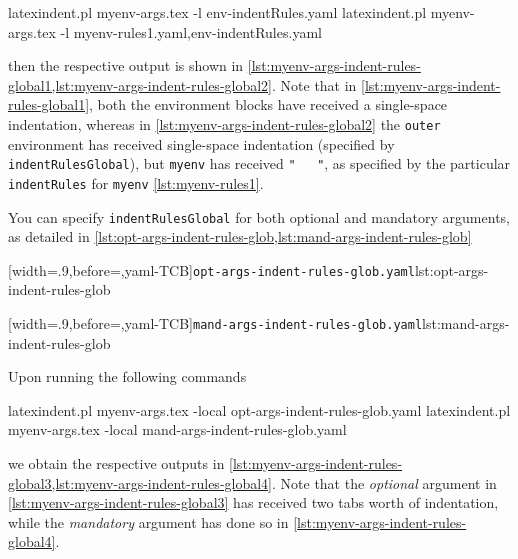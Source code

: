 	\begin{commandshell}
latexindent.pl  myenv-args.tex -l env-indentRules.yaml
latexindent.pl  myenv-args.tex -l myenv-rules1.yaml,env-indentRules.yaml
\end{commandshell}
	then the respective output is shown in \cref{lst:myenv-args-indent-rules-global1,lst:myenv-args-indent-rules-global2}. Note that
	in \cref{lst:myenv-args-indent-rules-global1}, both the environment blocks have received a single-space indentation, whereas in
	\cref{lst:myenv-args-indent-rules-global2} the \texttt{outer} environment has received single-space indentation (specified by \texttt{indentRulesGlobal}),
	but \texttt{myenv} has received \lstinline!"   "!, as specified by the particular \texttt{indentRules} for \texttt{myenv} \vref{lst:myenv-rules1}.

	\begin{minipage}{.45\textwidth}
	\end{minipage}
	\hfill
	\begin{minipage}{.45\textwidth}
	\end{minipage}

	You can specify \texttt{indentRulesGlobal} for both optional and mandatory arguments, as detailed in \cref{lst:opt-args-indent-rules-glob,lst:mand-args-indent-rules-glob}

	\begin{minipage}{.49\textwidth}
		[width=.9\linewidth,before=\centering,yaml-TCB]{\texttt{opt-args-indent-rules-glob.yaml}}{lst:opt-args-indent-rules-glob}
	\end{minipage}
	\hfill
	\begin{minipage}{.49\textwidth}
		[width=.9\linewidth,before=\centering,yaml-TCB]{\texttt{mand-args-indent-rules-glob.yaml}}{lst:mand-args-indent-rules-glob}
	\end{minipage}

	Upon running the following commands
	\begin{commandshell}
latexindent.pl  myenv-args.tex -local opt-args-indent-rules-glob.yaml
latexindent.pl  myenv-args.tex -local mand-args-indent-rules-glob.yaml
\end{commandshell}
	we obtain the respective outputs in \cref{lst:myenv-args-indent-rules-global3,lst:myenv-args-indent-rules-global4}. Note that the \emph{optional}
	argument in \cref{lst:myenv-args-indent-rules-global3} has received two tabs worth of indentation, while the \emph{mandatory} argument has
	done so in \cref{lst:myenv-args-indent-rules-global4}.

